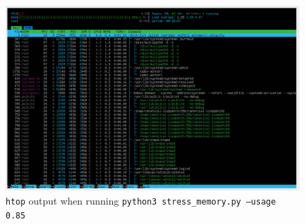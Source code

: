 \documentclass[a4paper]{article}
\begin{document}
\begin{figure}[H]
    \centering
    \includegraphics[width=\textwidth]{./images/memstress.png}
    \caption{\texttt{htop} output when running \texttt{python3 stress_memory.py --usage 0.85}}
\end{figure}

\printbibliography
\end{document}
